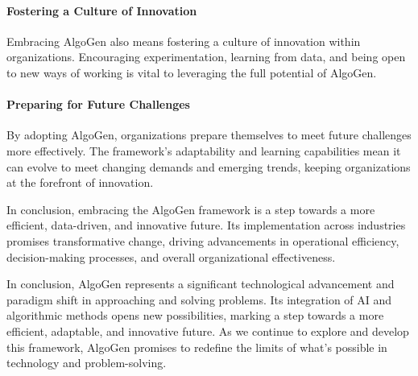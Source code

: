 \documentclass{article}
\begin{document}
\paragraph{Fostering a Culture of Innovation}
Embracing AlgoGen also means fostering a culture of innovation within organizations. Encouraging experimentation, learning from data, and being open to new ways of working is vital to leveraging the full potential of AlgoGen.

\paragraph{Preparing for Future Challenges}
By adopting AlgoGen, organizations prepare themselves to meet future challenges more effectively. The framework's adaptability and learning capabilities mean it can evolve to meet changing demands and emerging trends, keeping organizations at the forefront of innovation.

In conclusion, embracing the AlgoGen framework is a step towards a more efficient, data-driven, and innovative future. Its implementation across industries promises transformative change, driving advancements in operational efficiency, decision-making processes, and overall organizational effectiveness.



In conclusion, AlgoGen represents a significant technological advancement and paradigm shift in approaching and solving problems. Its integration of AI and algorithmic methods opens new possibilities, marking a step towards a more efficient, adaptable, and innovative future. As we continue to explore and develop this framework, AlgoGen promises to redefine the limits of what’s possible in technology and problem-solving.
\end{document}
